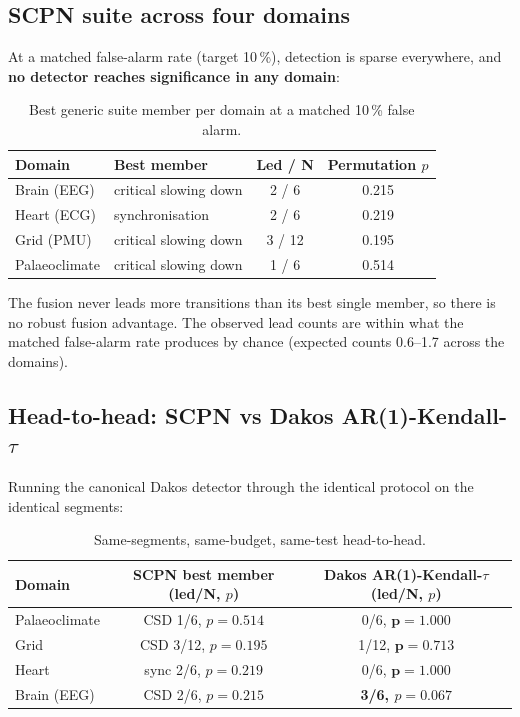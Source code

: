 \documentclass[11pt]{article}
\begin{document}
\subsection{SCPN suite across four domains}\label{sec:fourdomain}

At a matched false-alarm rate (target 10\,\%), detection is sparse
everywhere, and \textbf{no detector reaches significance in any domain}:

\begin{table}[h!]
\centering
\begin{tabular}{llcc}
\toprule
Domain & Best member & Led / N & Permutation $p$ \\
\midrule
Brain (EEG) & critical slowing down & 2 / 6 & 0.215 \\
Heart (ECG) & synchronisation & 2 / 6 & 0.219 \\
Grid (PMU) & critical slowing down & 3 / 12 & 0.195 \\
Palaeoclimate & critical slowing down & 1 / 6 & 0.514 \\
\bottomrule
\end{tabular}
\caption{Best generic suite member per domain at a matched 10\,\% false alarm.}
\end{table}

The fusion never leads more transitions than its best single member, so
there is no robust fusion advantage. The observed lead counts are within
what the matched false-alarm rate produces by chance (expected counts
0.6--1.7 across the domains).

\subsection{Head-to-head: SCPN vs Dakos AR(1)-Kendall-$\tau$}\label{sec:headtohead}

Running the canonical Dakos detector through the identical protocol on
the identical segments:

\begin{table}[h!]
\centering
\begin{tabular}{lcc}
\toprule
Domain & SCPN best member (led/N, $p$) & Dakos AR(1)-Kendall-$\tau$ (led/N, $p$) \\
\midrule
Palaeoclimate & CSD 1/6, $p = 0.514$ & 0/6, $\mathbf{p = 1.000}$ \\
Grid & CSD 3/12, $p = 0.195$ & 1/12, $\mathbf{p = 0.713}$ \\
Heart & sync 2/6, $p = 0.219$ & 0/6, $\mathbf{p = 1.000}$ \\
Brain (EEG) & CSD 2/6, $p = 0.215$ & \textbf{3/6, $p = 0.067$} \\
\bottomrule
\end{tabular}
\caption{Same-segments, same-budget, same-test head-to-head.}
\end{table}
\end{document}
